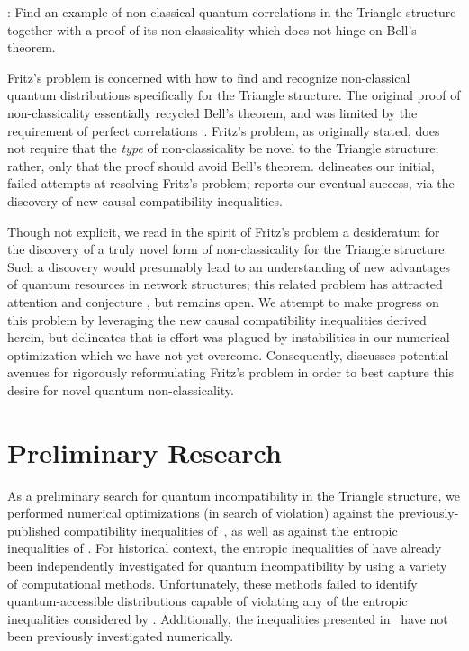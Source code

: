 \documentclass[aps, 10pt, english, twoside, pra, nofootinbib, tightenlines, longbibliography, superscriptaddress]{revtex4-1}
\begin{document}
    : Find an example of non-classical quantum correlations in the Triangle structure together with a proof of its non-classicality which does not hinge on Bell’s theorem.

    Fritz's problem is concerned with how to find and recognize non-classical quantum distributions specifically for the Triangle structure. The original proof of non-classicality essentially recycled Bell's theorem, and was limited by the requirement of perfect correlations~\cite{Fritz_2012}. Fritz's problem, as originally stated, does not require that the \emph{type} of non-classicality be novel to the Triangle structure; rather, only that the proof should avoid Bell's theorem.  delineates our initial, failed attempts at resolving Fritz's problem;  reports our eventual success, via the discovery of new causal compatibility inequalities.

    Though not explicit, we read in the spirit of Fritz's problem a desideratum for the discovery of a truly novel form of non-classicality for the Triangle structure. Such a discovery would presumably lead to an understanding of new advantages of quantum resources in network structures; this related problem has attracted attention and conjecture \cite{Gisin_2017}, but remains open. We attempt to make progress on this problem by leveraging the new causal compatibility inequalities derived herein, but  delineates that is effort was plagued by instabilities in our numerical optimization which we have not yet overcome. Consequently,  discusses potential avenues for rigorously reformulating Fritz's problem in order to best capture this desire for novel quantum non-classicality.

    \section{Preliminary Research}
    \label{sec:preliminary_research}

    As a preliminary search for quantum incompatibility in the Triangle structure, we performed numerical optimizations (in search of violation) against the previously-published compatibility inequalities of~\citet{Inflation}, as well as against the entropic inequalities of \citet{Henson_2014}. For historical context, the entropic inequalities of \cite{Henson_2014} have already been independently investigated for quantum incompatibility by \citet{Weilenmann_2016} using a variety of computational methods. Unfortunately, these methods failed to identify quantum-accessible distributions capable of violating any of the entropic inequalities considered by \cite{Weilenmann_2016}. Additionally, the inequalities presented in~\cite{Inflation} have not been previously investigated numerically.
\end{document}
